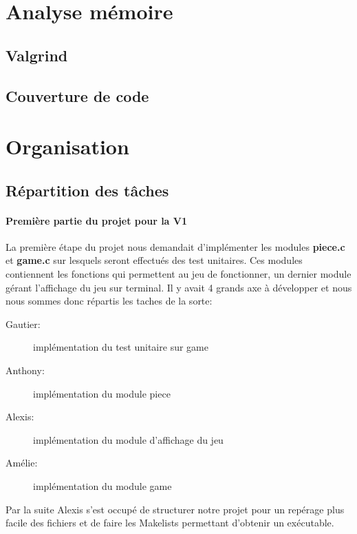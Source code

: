 \documentclass{report}
\begin{document}
\chapter{Analyse mémoire}
\setcounter{section}{0}
\section{Valgrind}

\section{Couverture de code}



\chapter{Organisation}
\setcounter{section}{0}
\section{Répartition des tâches}
\subsubsection*{Première partie du projet pour la V1}
La première étape du projet nous demandait d'implémenter les modules \textbf{piece.c} et \textbf{game.c} sur lesquels seront effectués des test unitaires. Ces modules contiennent les fonctions qui permettent au jeu de fonctionner, un dernier module gérant l'affichage du jeu sur terminal. Il y avait 4 grands axe à développer et nous nous sommes donc répartis les taches de la sorte:
\begin{description}
\item [Gautier:] implémentation du test unitaire sur game
\item [Anthony:] implémentation du module piece
\item [Alexis:] implémentation du module d'affichage du jeu
\item [Amélie:] implémentation du module game
\end{description}
Par la suite Alexis s'est occupé de structurer notre projet pour un repérage plus facile des fichiers et de faire les Makelists permettant d'obtenir un exécutable.
\end{document}
